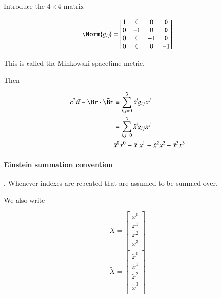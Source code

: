 Introduce the $4 \times 4$ matrix 

\begin{equation}\label{eqn:relativisticElectrodynamicsL6:30}
\Norm{g_{ij}} = 
\begin{bmatrix}
1 & 0 & 0 & 0 \\
0 & -1 & 0 & 0 \\
0 & 0 & -1 & 0 \\
0 & 0 & 0 & -1 \\
\end{bmatrix}
\end{equation}

This is called the Minkowski spacetime metric.

Then 

\begin{align*}
c^2 t \tilde{t} - \Br \cdot \tilde{\Br}
&\equiv \sum_{i, j = 0}^3 \tilde{x}^i g_{ij} x^j \\
&= \sum_{i, j = 0}^3 \tilde{x}^i g_{ij} x^j \\
& 
\tilde{x}^0 x^0 
-\tilde{x}^1 x^1 
-\tilde{x}^2 x^2 
-\tilde{x}^3 x^3 
\end{align*}

\paragraph{Einstein summation convention}.  Whenever indexes are repeated that are assumed to be summed over.

We also write

\begin{equation}\label{eqn:relativisticElectrodynamicsL6:40}
X = 
\begin{bmatrix}
x^0 \\
x^1 \\
x^2 \\
x^3 \\
\end{bmatrix}
\end{equation}
\begin{equation}\label{eqn:relativisticElectrodynamicsL6:50}
\tilde{X} = 
\begin{bmatrix}
\tilde{x}^0 \\
\tilde{x}^1 \\
\tilde{x}^2 \\
\tilde{x}^3 \\
\end{bmatrix}
\end{equation}

